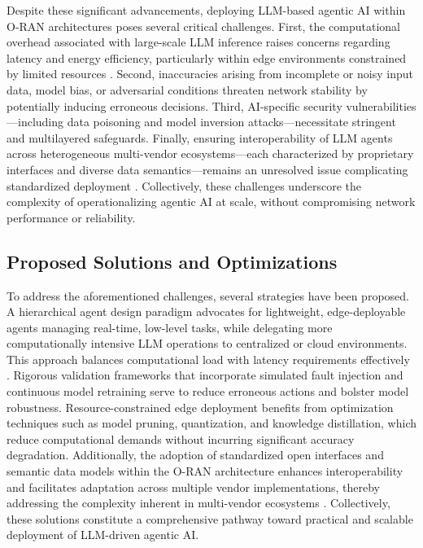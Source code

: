 \documentclass[11pt]{article}
\begin{document}
\begin{itemize}
Despite these significant advancements, deploying LLM-based agentic AI within O-RAN architectures poses several critical challenges. First, the computational overhead associated with large-scale LLM inference raises concerns regarding latency and energy efficiency, particularly within edge environments constrained by limited resources \cite{ref55, ref48}. Second, inaccuracies arising from incomplete or noisy input data, model bias, or adversarial conditions threaten network stability by potentially inducing erroneous decisions. Third, AI-specific security vulnerabilities—including data poisoning and model inversion attacks—necessitate stringent and multilayered safeguards. Finally, ensuring interoperability of LLM agents across heterogeneous multi-vendor ecosystems—each characterized by proprietary interfaces and diverse data semantics—remains an unresolved issue complicating standardized deployment \cite{ref55, ref48}. Collectively, these challenges underscore the complexity of operationalizing agentic AI at scale, without compromising network performance or reliability.

\subsection{Proposed Solutions and Optimizations}

To address the aforementioned challenges, several strategies have been proposed. A hierarchical agent design paradigm advocates for lightweight, edge-deployable agents managing real-time, low-level tasks, while delegating more computationally intensive LLM operations to centralized or cloud environments. This approach balances computational load with latency requirements effectively \cite{ref55}. Rigorous validation frameworks that incorporate simulated fault injection and continuous model retraining serve to reduce erroneous actions and bolster model robustness. Resource-constrained edge deployment benefits from optimization techniques such as model pruning, quantization, and knowledge distillation, which reduce computational demands without incurring significant accuracy degradation. Additionally, the adoption of standardized open interfaces and semantic data models within the O-RAN architecture enhances interoperability and facilitates adaptation across multiple vendor implementations, thereby addressing the complexity inherent in multi-vendor ecosystems \cite{ref55}. Collectively, these solutions constitute a comprehensive pathway toward practical and scalable deployment of LLM-driven agentic AI.


\end{itemize}
\end{document}
